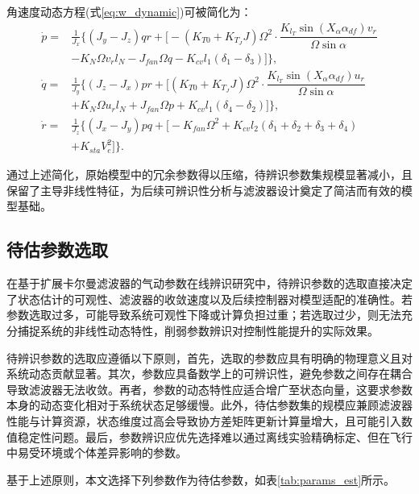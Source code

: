 角速度动态方程(式\eqref{eq:w_dynamic})可被简化为：
\begin{equation}
    \begin{aligned}
        \dot{p} = & \frac{1}{J_x} \biggl\{ (J_y - J_z)qr + \biggl[ - (K_{T0} + K_{T_J}J) \Omega^2 \cdot \dfrac{K_{l_T} \sin(X_\alpha \alpha_{df}) v_r}{\Omega \sin\alpha} \\
        & - K_{N} \Omega v_r l_N - J_{{fan}} \Omega q - K_{cv} l_1 (\delta_1 - \delta_3) \biggr] \biggr\}, \\
        \dot{q} = & \frac{1}{J_y} \biggl\{(J_z - J_x)pr + \biggl[  (K_{T0} + K_{T_J}J) \Omega^2 \cdot \dfrac{K_{l_T} \sin(X_\alpha \alpha_{df}) u_r}{\Omega \sin\alpha} \\
        & + K_{N} \Omega u_r l_N + J_{{fan}} \Omega p + K_{cv} l_1 (\delta_4 - \delta_2) \biggr] \biggr\}, \\
        \dot{r} = & \frac{1}{J_z} \biggl\{ (J_x - J_y)pq + \biggl[ - K_{fan} \Omega^2  + K_{cv} l_2 (\delta_1 + \delta_2 + \delta_3 + \delta_4) \\
        & + K_{sta} V_e^2 \biggr] \biggr\}.
    \end{aligned}
    \label{eq:omega_dynamic_sim}
\end{equation}

通过上述简化，原始模型中的冗余参数得以压缩，待辨识参数集规模显著减小，且保留了主导非线性特征，为后续可辨识性分析与滤波器设计奠定了简洁而有效的模型基础。

\subsection{待估参数选取}
在基于扩展卡尔曼滤波器的气动参数在线辨识研究中，待辨识参数的选取直接决定了状态估计的可观性、滤波器的收敛速度以及后续控制器对模型适配的准确性。若参数选取过多，可能导致系统可观性下降或计算负担过重；若选取过少，则无法充分捕捉系统的非线性动态特性，削弱参数辨识对控制性能提升的实际效果。

待辨识参数的选取应遵循以下原则，首先，选取的参数应具有明确的物理意义且对系统动态贡献显著。其次，参数应具备数学上的可辨识性，避免参数之间存在耦合导致滤波器无法收敛。再者，参数的动态特性应适合增广至状态向量，这要求参数本身的动态变化相对于系统状态足够缓慢。此外，待估参数集的规模应兼顾滤波器性能与计算资源，状态维度过高会导致协方差矩阵更新计算量增大，且可能引入数值稳定性问题。最后，参数辨识应优先选择难以通过离线实验精确标定、但在飞行中易受环境或个体差异影响的参数。

基于上述原则，本文选择下列参数作为待估参数，如表\ref{tab:params_est}所示。

